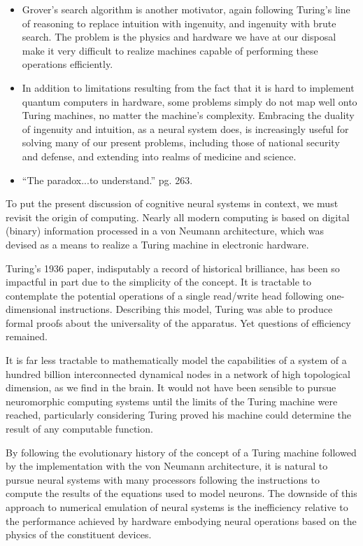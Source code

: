 \documentclass[twocolumn]{article}
\begin{document}
\begin{itemize}
\item Grover's search algorithm is another motivator, again following Turing's line of reasoning to replace intuition with ingenuity, and ingenuity with brute search. The problem is the physics and hardware we have at our disposal make it very difficult to realize machines capable of performing these operations efficiently. 
\item In addition to limitations resulting from the fact that it is hard to implement quantum computers in hardware, some problems simply do not map well onto Turing machines, no matter the machine's complexity. Embracing the duality of ingenuity and intuition, as a neural system does, is increasingly useful for solving many of our present problems, including those of national security and defense, and extending into realms of medicine and science.
\item ``The paradox...to understand.'' \cite{dy2012} pg. 263.
\end{itemize}

\vspace{3em}
To put the present discussion of cognitive neural systems in context, we must revisit the origin of computing. Nearly all modern computing is based on digital (binary) information processed in a von Neumann architecture, which was devised as a means to realize a Turing machine in electronic hardware.

\vspace{3em}
Turing's 1936 paper, indisputably a record of historical brilliance, has been so impactful in part due to the simplicity of the concept. It is tractable to contemplate the potential operations of a single read/write head following one-dimensional instructions. Describing this model, Turing was able to produce formal proofs about the universality of the apparatus. Yet questions of efficiency remained. 

It is far less tractable to mathematically model the capabilities of a system of a hundred billion interconnected dynamical nodes in a network of high topological dimension, as we find in the brain. It would not have been sensible to pursue neuromorphic computing systems until the limits of the Turing machine were reached, particularly considering Turing proved his machine could determine the result of any computable function.

By following the evolutionary history of the concept of a Turing machine followed by the implementation with the von Neumann architecture, it is natural to pursue neural systems with many processors following the instructions to compute the results of the equations used to model neurons. The downside of this approach to numerical emulation of neural systems is the inefficiency relative to the performance achieved by hardware embodying neural operations based on the physics of the constituent devices.
\end{document}

